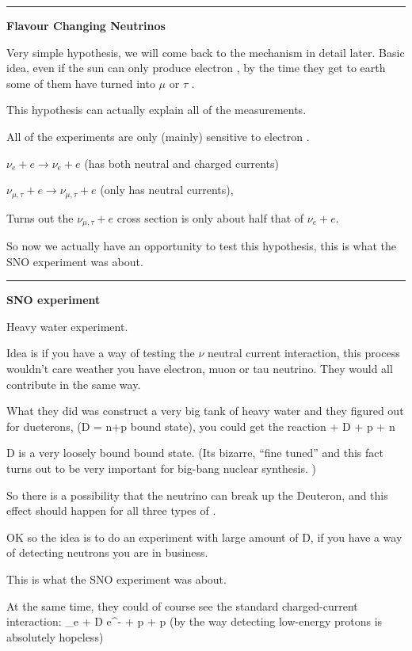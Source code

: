 {\noindent\rule{\textwidth}{1pt}

\textbf{Flavour Changing Neutrinos}

Very simple hypothesis, we will come back to the mechanism in detail later. 
Basic idea, even if the sun can only produce electron \nus, by the time they get to earth some of them have turned into $\mu$ or $\tau$ \nus. 


This hypothesis can actually explain all of the measurements.  

All of the experiments are only (mainly) sensitive to electron \nus.

\bc
$\nu_e + e \rightarrow \nu_e + e$  (has both neutral and charged currents) 
\ec

\bc
$\nu_{\mu,\tau} + e \rightarrow \nu_{\mu,\tau} + e$  (only has neutral currents), 
\ec

Turns out the $\nu_{\mu,\tau} + e$ cross section is only about half that of $\nu_e + e$.

So now we actually have an opportunity to test this hypothesis, this is what the SNO experiment was about.

\noindent\rule{\textwidth}{1pt}

\clearpage

\textbf{SNO experiment}

Heavy water experiment.

Idea is if you have a way of testing the $\nu$ neutral current interaction, this process wouldn't care weather you have electron, muon or tau neutrino. 
They would all contribute in the same way. 

What they did was construct a very big tank of heavy water and they figured out for dueterons, (D  = n+p bound state), you could get the reaction
\be
\nu + D \rightarrow \nu + p + n
\ee

D is a very loosely bound bound state. (Its bizarre, ``fine tuned'' and this fact turns out to be very important for big-bang nuclear synthesis. )

So there is a possibility that the neutrino can break up the Deuteron, and this effect should happen for all three types of \nus.

OK so the idea is to do an experiment with large amount of D, if you have a way of detecting neutrons you are in business.

This is what the SNO experiment was about. 

At the same time, they could of course see the standard charged-current interaction:
\be
\nu_e + D \rightarrow e^- + p + p
\ee
(by the way detecting low-energy protons is absolutely hopeless)


}
